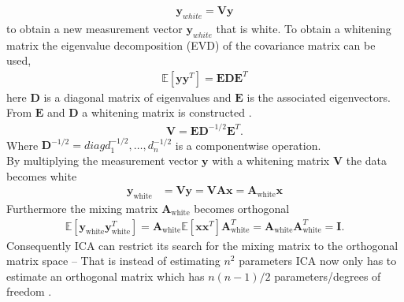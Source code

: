 \begin{align*}
\textbf{y}_{white} = \textbf{V}\textbf{y}
\end{align*} 
to obtain a new measurement vector $\textbf{y}_{white}$ that is white. To obtain a whitening matrix the eigenvalue decomposition (EVD) of the covariance matrix can be used,
\begin{align*}
\mathbb{E}[\mathbf{yy}^T] = \mathbf{EDE}^T
\end{align*}
here $\mathbf{D}$ is a diagonal matrix of eigenvalues and $\mathbf{E}$ is the associated eigenvectors. From $\mathbf{E}$ and $\mathbf{D}$ a whitening matrix is constructed \cite[p.159]{ICA}.
\begin{align*}
\mathbf{V} = \mathbf{ED}^{-1/2} \mathbf{E}^T.
\end{align*}
Where $\mathbf{D}^{-1/2}=diag{d_1^{-1/2},\hdots,d_n^{-1/2}}$ is a componentwise operation.\\  
By multiplying the measurement vector $\mathbf{y}$ with a whitening matrix $\mathbf{V}$ the data becomes white
\begin{align}
\mathbf{y}_{\text{white}} &= \mathbf{Vy} = \mathbf{VAx} = \mathbf{A}_{\text{white}} \mathbf{x} \nonumber
\end{align}
Furthermore the mixing matrix $\mathbf{A}_{\text{white}}$ becomes orthogonal 
\begin{align*}
 \mathbb{E}[\mathbf{y}_{\text{white}} \mathbf{y}_{\text{white}}^T] = \mathbf{A}_{\text{white}} \mathbb{E}[\mathbf{xx}^T] \mathbf{A}_{\text{white}}^T = \mathbf{A}_{\text{white}} \mathbf{A}_{\text{white}}^T = \mathbf{I}.
 \end{align*} 
Consequently ICA can restrict its search for the mixing matrix to the orthogonal matrix space -- That is instead of estimating $n^2$ parameters ICA now only has to estimate an orthogonal matrix which has $n(n-1)/2$ parameters/degrees of freedom \cite[p. 159]{ICA}
.

